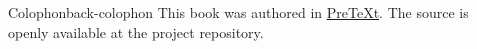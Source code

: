 \documentclass[oneside,10pt,]{book}
\providecommand\phantomsection{}
\begin{document}
%
\backmatter%
%
\clearpage\phantomsection%
%
\clearpage
\pagestyle{empty}
\begin{backcolophon}{Colophon}{back-colophon}%
This book was authored in \href{https://pretextbook.org}{PreTeXt}\footnotemark{}. The source is openly available at the project repository.%
\end{backcolophon}%
%
\end{document}
